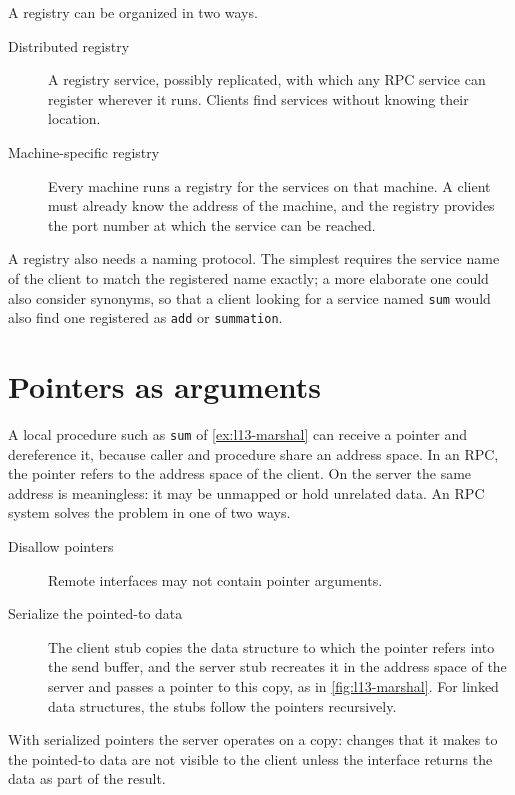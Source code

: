 \documentclass[../main.tex]{subfiles}
\begin{document}
A registry can be organized in two ways.
\begin{description}
  \item[Distributed registry] A registry service, possibly replicated,
    with which any RPC service can register wherever it runs.  Clients find
    services without knowing their location.
  \item[Machine-specific registry] Every machine runs a registry for the
    services on that machine.  A client must already know the address of
    the machine, and the registry provides the port number at which the
    service can be reached.
\end{description}
A registry also needs a naming protocol.  The simplest requires the service
name of the client to match the registered name exactly; a more elaborate
one could also consider synonyms, so that a client looking for a service
named \texttt{sum} would also find one registered as \texttt{add} or
\texttt{summation}.

\section{Pointers as arguments}
\label{sec:l13-pointers}

A local procedure such as \texttt{sum} of \cref{ex:l13-marshal} can
receive a pointer and dereference it, because caller and procedure share an
address space.  In an RPC,
the pointer refers to the address space of the client.  On the server the
same address is meaningless: it may be unmapped or hold unrelated data.
An RPC system solves the problem in one of two ways.
\begin{description}
  \item[Disallow pointers] Remote interfaces may not contain pointer
    arguments.
  \item[Serialize the pointed-to data] The client stub copies the data
    structure to which the pointer refers into the send buffer, and the
    server stub recreates it in the address space of the server and passes
    a pointer to this copy, as in \cref{fig:l13-marshal}.  For linked data
    structures, the stubs follow the pointers recursively.
\end{description}
With serialized pointers the server operates on a copy: changes that it
makes to the pointed-to data are not visible to the client unless the
interface returns the data as part of the result.
\end{document}
